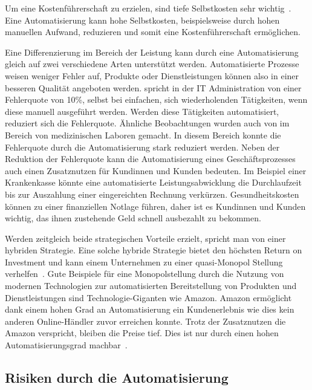 Um eine Kostenführerschaft zu erzielen, sind tiefe Selbstkosten sehr wichtig~\autocite{Capaul2010}. Eine Automatisierung kann hohe Selbstkosten, beispielsweise durch hohen manuellen Aufwand, reduzieren und somit eine Kostenführerschaft ermöglichen.

Eine Differenzierung im Bereich der Leistung kann durch eine Automatisierung gleich auf zwei verschiedene Arten unterstützt werden. Automatisierte Prozesse weisen weniger Fehler auf, Produkte oder Dienstleistungen können also in einer besseren Qualität angeboten werden. \textcite{Kregassner2012} spricht in der IT Administration von einer Fehlerquote von 10\%, selbst bei einfachen, sich wiederholenden Tätigkeiten, wenn diese manuell ausgeführt werden. Werden diese Tätigkeiten automatisiert, reduziert sich die Fehlerquote. Ähnliche Beobachtungen wurden auch von \textcite{Uettwiller-Geiger2005} im Bereich von medizinischen Laboren gemacht. In diesem Bereich konnte die Fehlerquote durch die Automatisierung stark reduziert werden. Neben der Reduktion der Fehlerquote kann die Automatisierung eines Geschäftsprozesses auch einen Zusatznutzen für Kundinnen und Kunden bedeuten. Im Beispiel einer Krankenkasse könnte eine automatisierte Leistungsabwicklung die Durchlaufzeit bis zur Auszahlung einer eingereichten Rechnung verkürzen. Gesundheitskosten können zu einer finanziellen Notlage führen, daher ist es Kundinnen und Kunden wichtig, das ihnen zustehende Geld schnell ausbezahlt zu bekommen.

Werden zeitgleich beide strategischen Vorteile erzielt, spricht man von einer hybriden Strategie. Eine solche hybride Strategie bietet den höchsten Return on Investment und kann einem Unternehmen zu einer quasi-Monopol Stellung verhelfen~\autocite{Lombriser2010}. Gute Beispiele für eine Monopolstellung durch die Nutzung von modernen Technologien zur automatisierten Bereitstellung von Produkten und Dienstleistungen sind Technologie-Giganten wie Amazon. Amazon ermöglicht dank einem hohen Grad an Automatisierung ein Kundenerlebnis wie dies kein anderen Online-Händler zuvor erreichen konnte. Trotz der Zusatznutzen die Amazon verspricht, bleiben die Preise tief. Dies ist nur durch einen hohen Automatisierungsgrad machbar~\autocite{Kha2000}.

\subsection{Risiken durch die Automatisierung}

